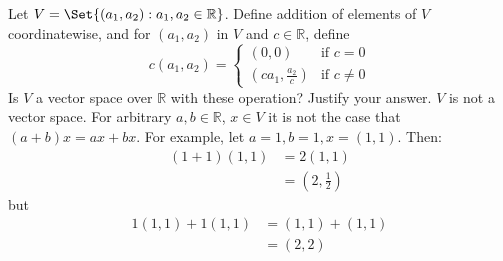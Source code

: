 \documentclass[paper=a4, fontsize=11pt]{jhwhw} %
\begin{document}
Let $V = \Set{(a_1, a_2):a_1, a_2\in \mathbb{R}}$. Define addition of elements of $V$ coordinatewise, and for $(a_1, a_2)$ in $V$ and $c\in \mathbb{R}$, define
\[c(a_1, a_2) =  \begin{cases} 
        (0, 0) & \text{if } c = 0\\
        (ca_1, \frac{a_2}{c}) & \text{if } c \not= 0
    \end{cases}
\]
Is $V$ a vector space over $\mathbb{R}$ with these operation? Justify your answer.
\solution
$V$ is not a vector space. For arbitrary $a, b\in \mathbb R$, $x\in V$ it is not the case that $(a+b)x = ax + bx$.
For example, let $a=1, b=1, x=(1, 1)$. Then:
\begin{align}
    (1+1)(1, 1) &= 2(1, 1)\\
                &= (2, \frac{1}{2})
\end{align}
but
\begin{align}
    1(1, 1) + 1(1, 1) &= (1, 1) + (1, 1)\\
                      &= (2, 2)
\end{align}
%
%
\end{document}
